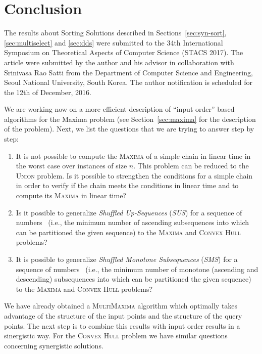 \section{Conclusion}
\label{sec:con}


The results about Sorting Solutions described in
Sections~\ref{sec:syn-sort}, \ref{sec:multiselect} and \ref{sec:dds}
were submitted to the 34th International Symposium on Theoretical
Aspects of Computer Science (STACS 2017). The article were submitted
by the author and his advisor in collaboration with Srinivasa Rao Satti
from the Department of Computer Science and Engineering, Seoul
National University, South Korea. The author notification is scheduled
for the 12th of December, 2016.


We are working now on a more efficient description of ``input order''
based algorithms for the Maxima problem (see Section~\ref{sec:maxima}
for the description of the problem). Next, we list the questions that
we are trying to answer step by step:

\begin{enumerate}
\item It is not possible to compute the \textsc{Maxima} of a simple
  chain in linear time in the worst case over instances of size
  $n$. This problem can be reduced to the \textsc{Union} problem. Is it
  possible to strengthen the conditions for a simple chain in order to
  verify if the chain meets the conditions in linear time and to
  compute its \textsc{Maxima} in linear time?
\item Is it possible to generalize \emph{Shuffled Up-Sequences}
  (\emph{SUS}) for a sequence of
  numbers~\cite{1990-SWAT-SortingShuffledMonotoneSequences-LevcopoulosPetersson}
  (i.e., the minimum number of ascending subsequences into which can
  be partitioned the given sequence) to the \textsc{Maxima} and
  \textsc{Convex Hull} problems?
\item It is possible to generalize \emph{Shuffled Monotone
    Subsequences} (\emph{SMS}) for a sequence of
  numbers~\cite{1990-SWAT-SortingShuffledMonotoneSequences-LevcopoulosPetersson}
  (i.e., the minimum number of monotone (ascending and descending)
  subsequences into which can be partitioned the given sequence) to
  the \textsc{Maxima} and \textsc{Convex Hull} problems?
\end{enumerate}

We have already obtained a \textsc{MultiMaxima} algorithm which optimally takes
advantage of the structure of the input points and the structure of
the query points. The next step is to combine this results with input
order results in a sinergistic way.
For the \textsc{Convex Hull} problem we have similar questions
concerning synergistic solutions.

